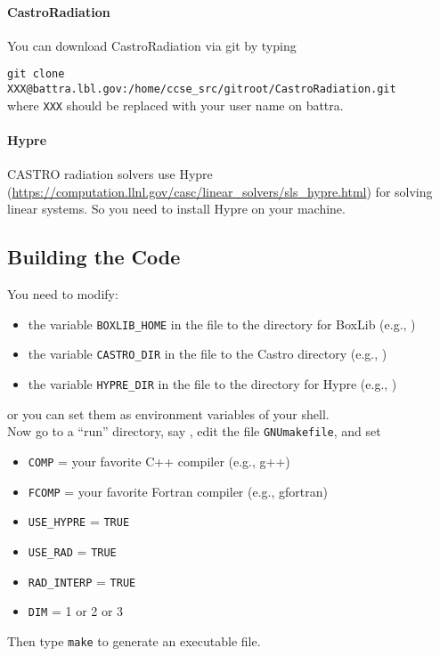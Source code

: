 \documentclass[11pt,letterpaper]{article}
\begin{document}
\paragraph{CastroRadiation} You can download CastroRadiation via git by typing
\vspace{5pt}

\verb|git clone XXX@battra.lbl.gov:/home/ccse_src/gitroot/CastroRadiation.git|\\[5pt]
where {\tt XXX} should be replaced with your user name on battra.  

\paragraph{Hypre} CASTRO radiation solvers use Hypre
(\url{https://computation.llnl.gov/casc/linear_solvers/sls_hypre.html})
for solving linear systems.  So you need to install Hypre on your
machine.

\subsection{Building the Code}

You need to modify:
\begin{itemize}
\item the variable {\tt BOXLIB\_HOME} in the file
  {\tt{}} to the
  directory for BoxLib (e.g., {\tt{}})
\item the variable {\tt CASTRO\_DIR} in the file
  {\tt{}} to
  the Castro directory
  (e.g., {\tt{}})
\item the variable {\tt HYPRE\_DIR} in the file
  {\tt{}} to
  the directory for Hypre (e.g., {\tt{}})
\end{itemize}
or you can set them as environment variables of your shell.  \\


Now go to a ``run'' directory, say
{\tt{}},
edit the file {\tt GNUmakefile}, and set
\begin{itemize}
\item {\tt COMP} = your favorite C++ compiler (e.g., g++)
\item {\tt FCOMP} = your favorite Fortran compiler (e.g., gfortran)
\item {\tt USE\_HYPRE} = {\tt TRUE}
\item {\tt USE\_RAD}   = {\tt TRUE}
\item {\tt RAD\_INTERP}   = {\tt TRUE}
\item {\tt DIM}   = 1 or 2 or 3
\end{itemize}
Then type {\tt make} to generate an executable file.  
\end{document}
